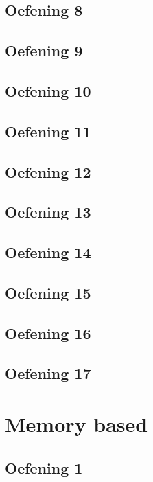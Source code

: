 \documentclass[a4paper,11pt]{report}
\begin{document}
\section{Oefening 8}

\section{Oefening 9}

\section{Oefening 10}

\section{Oefening 11}

\section{Oefening 12}

\section{Oefening 13}

\section{Oefening 14}

\section{Oefening 15}

\section{Oefening 16}

\section{Oefening 17}


\newpage

\chapter{Memory based}
\section{Oefening 1}

\end{document}

